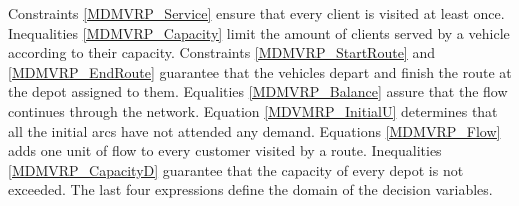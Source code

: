 \documentclass[preprint,review,12pt]{elsarticle}
\begin{document}
Constraints \eqref{MDMVRP_Service} ensure that every client is visited at least once. Inequalities \eqref{MDMVRP_Capacity} limit the amount of clients served by a vehicle according to their capacity. Constraints \eqref{MDMVRP_StartRoute} and \eqref{MDMVRP_EndRoute} guarantee that the vehicles depart and finish the route at the depot assigned to them. Equalities \eqref{MDMVRP_Balance} assure that the flow continues through the network. Equation \eqref{MDVMRP_InitialU} determines that all the initial arcs have not attended any demand. Equations \eqref{MDMVRP_Flow} adds one unit of flow to every customer visited by a route. Inequalities \eqref{MDMVRP_CapacityD} guarantee that the capacity of every depot is not exceeded. The last four expressions define the domain of the decision variables.
\end{document}
